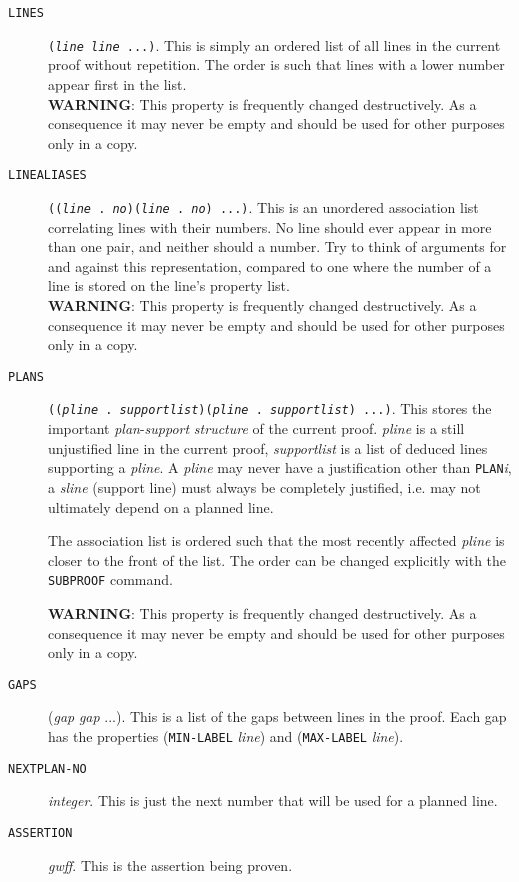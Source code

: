 \begin{description}
\item [{\tt LINES}] {\tt ({\it line} {\it line} ...)}.  This is simply an ordered list of all
lines in the current proof without repetition.  The order is such that
lines with a lower number appear first in the list.
\\ {\bf WARNING}:  This property is frequently changed destructively.
As a consequence it may never be empty and should be used for other
purposes only in a copy.

\item [{\tt LINEALIASES}] {\tt (({\it line} . {\it no})({\it line} . {\it no}) ...)}.  This is an 
unordered association list correlating lines with their numbers.  No line 
should ever appear in more than one pair, and neither should a number.  Try to 
think of arguments for and against this representation, compared to one where
the number of a line is stored on the line's property list.
\\ {\bf WARNING}:  This property is frequently changed destructively.
As a consequence it may never be empty and should be used for other
purposes only in a copy.

\item [{\tt PLANS}] {\tt {(({\it pline} . {\it supportlist})({\it pline} . {\it supportlist}) ...)}}.
This stores the important {\it plan}-{\it support} {\it structure} of the current
proof.  {\it pline} is a still unjustified line in the current proof,
{\it supportlist} is a list of deduced lines supporting a {\it pline}.
A {\it pline} may never have a justification other than {\tt PLAN}{\it i}, 
a {\it sline} (support line) must always be completely justified, i.e.
may not ultimately depend on a planned line.

The association list is ordered such that the most recently affected
{\it pline} is closer to the front of the list.  The order can be changed
explicitly with the {\tt SUBPROOF} command.

{\bf WARNING}:  This property is frequently changed destructively.
As a consequence it may never be empty and should be used for other
purposes only in a copy.

\item [{\tt GAPS}] ({\it gap} {\it gap} ...). This is a list of the gaps between lines in the
proof. Each gap has the properties ({\tt MIN-LABEL} {\it line}) and ({\tt MAX-LABEL} {\it line}).

\item [{\tt NEXTPLAN-NO}] {\it integer}. This is just the next number that will be used for 
a planned line.

\item [{\tt ASSERTION}] {\it gwff}. This is the assertion being proven.
\end{description}

